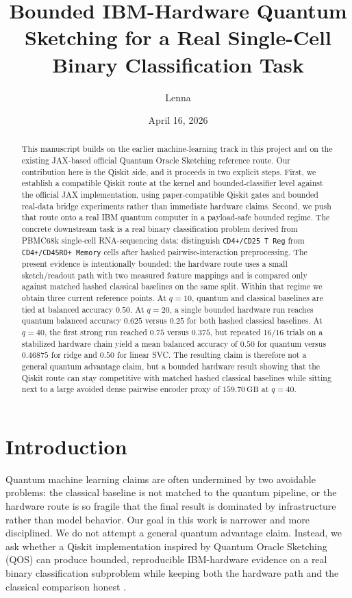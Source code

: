\documentclass[11pt]{article}
\title{Bounded IBM-Hardware Quantum Sketching for a Real Single-Cell Binary Classification Task}
\author{Lenna}
\date{April 16, 2026}
\begin{document}
\maketitle

\begin{abstract}
This manuscript builds on the earlier machine-learning track in this project and on the existing JAX-based official Quantum Oracle Sketching reference route. Our contribution here is the Qiskit side, and it proceeds in two explicit steps. First, we establish a compatible Qiskit route at the kernel and bounded-classifier level against the official JAX implementation, using paper-compatible Qiskit gates and bounded real-data bridge experiments rather than immediate hardware claims. Second, we push that route onto a real IBM quantum computer in a payload-safe bounded regime. The concrete downstream task is a real binary classification problem derived from PBMC68k single-cell RNA-sequencing data: distinguish \texttt{CD4+/CD25 T Reg} from \texttt{CD4+/CD45RO+ Memory} cells after hashed pairwise-interaction preprocessing. The present evidence is intentionally bounded: the hardware route uses a small sketch/readout path with two measured feature mappings and is compared only against matched hashed classical baselines on the same split. Within that regime we obtain three current reference points. At $q=10$, quantum and classical baselines are tied at balanced accuracy $0.50$. At $q=20$, a single bounded hardware run reaches quantum balanced accuracy $0.625$ versus $0.25$ for both hashed classical baselines. At $q=40$, the first strong run reached $0.75$ versus $0.375$, but repeated $16/16$ trials on a stabilized hardware chain yield a mean balanced accuracy of $0.50$ for quantum versus $0.46875$ for ridge and $0.50$ for linear SVC. The resulting claim is therefore not a general quantum advantage claim, but a bounded hardware result showing that the Qiskit route can stay competitive with matched hashed classical baselines while sitting next to a large avoided dense pairwise encoder proxy of $159.70\,\mathrm{GB}$ at $q=40$.
\end{abstract}

\section{Introduction}

Quantum machine learning claims are often undermined by two avoidable problems: the classical baseline is not matched to the quantum pipeline, or the hardware route is so fragile that the final result is dominated by infrastructure rather than model behavior. Our goal in this work is narrower and more disciplined. We do not attempt a general quantum advantage claim. Instead, we ask whether a Qiskit implementation inspired by Quantum Oracle Sketching (QOS) can produce bounded, reproducible IBM-hardware evidence on a real binary classification subproblem while keeping both the hardware path and the classical comparison honest \cite{officialqos2026,gilyen2019qsvt,schuld2019qml}.
\end{document}
